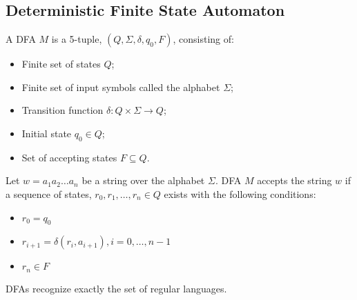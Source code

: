 \documentclass{report}
\begin{document}
		\subsection{Deterministic Finite State Automaton}
			\begin{defn} \label{def_DFA}
				A DFA $M$ is a 5-tuple, $(Q,\Sigma,\delta,q_0,F)$, consisting of:
				\begin{itemize}
					\item Finite set of states $Q$;
					\item Finite set of input symbols called the alphabet $\Sigma$;
					\item Transition function $\delta:Q \times \Sigma \rightarrow Q$;
					\item Initial state $q_0 \in Q$;
					\item Set of accepting states $F \subseteq Q$.
				\end{itemize}
				
				Let $w=a_1a_2\dots a_n$ be a string over the alphabet $\Sigma$. DFA $M$ accepts the string $w$ if a sequence of states, $r_0,r_1,\dots,r_n \in Q$ exists with the following conditions:
				\begin{itemize}
					\item $r_0=q_0$
					\item $r_{i+1}=\delta (r_i,a_{i+1}), i=0,\dots,n-1$
					\item $r_n \in F$
				\end{itemize}
			\end{defn}
		
			\begin{thm} \label{thm_DFA_RL}
				DFAs recognize exactly the set of regular languages.
			\end{thm}
		
\end{document}
